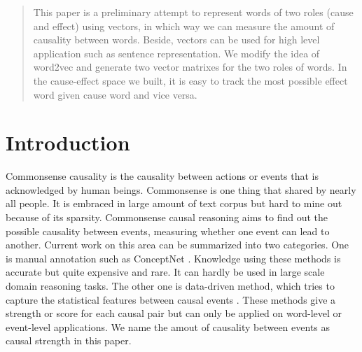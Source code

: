 \documentclass[conference]{IEEEtran}
\begin{document}




\maketitle


\begin{abstract}
This paper is a preliminary attempt to represent words of two roles (cause and effect) using vectors, in which way we can measure the amount of causality between words. Beside, vectors can be used for high level application such as sentence representation. We modify the idea of word2vec and generate two vector matrixes for the two roles of words. In the cause-effect space we built, it is easy to track the most possible effect word given cause word and vice versa. 
\end{abstract}





%
\IEEEpeerreviewmaketitle



\section{Introduction}
Commonsense causality is the causality between actions or events that is acknowledged by human beings. Commonsense is one thing that shared by nearly all people. It is embraced in large amount of text corpus but hard to mine out because of its sparsity. Commonsense causal reasoning aims to find out the possible causality between events, measuring whether one event can lead to another.
Current work on this area can be summarized into two categories. One is manual annotation such as ConceptNet \cite{conceptnet}. Knowledge using these methods is accurate but quite expensive and rare. It can hardly be used in large scale domain reasoning tasks. The other one is data-driven method, which tries to capture the statistical features between causal events \cite{kr2016}. These methods give a strength or score for each causal pair but can only be applied on word-level or event-level applications. We name the amout of causality between events as causal strength in this paper.
\end{document}
